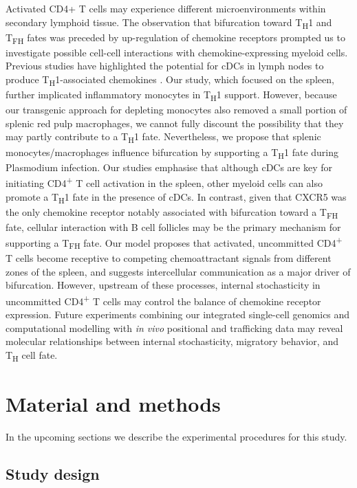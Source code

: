 Activated CD4+ T cells may experience different microenvironments within secondary lymphoid tissue. The observation that bifurcation toward T\textsubscript{H}1 and T\textsubscript{FH} fates was preceded by up-regulation of chemokine receptors prompted us to investigate possible cell-cell interactions with chemokine-expressing myeloid cells. Previous studies have highlighted the potential for cDCs in lymph nodes to produce T\textsubscript{H}1-associated chemokines \cite{Groom2012-az}. Our study, which focused on the spleen, further implicated inflammatory monocytes in T\textsubscript{H}1 support. However, because our transgenic approach for depleting monocytes also removed a small portion of splenic red pulp macrophages, we cannot fully discount the possibility that they may partly contribute to a T\textsubscript{H}1 fate. Nevertheless, we propose that splenic monocytes/macrophages influence bifurcation by supporting a T\textsubscript{H}1 fate during Plasmodium infection. Our studies emphasise that although cDCs are key for initiating CD4\textsuperscript{+} T cell activation in the spleen, other myeloid cells can also promote a T\textsubscript{H}1 fate in the presence of cDCs. In contrast, given that CXCR5 was the only chemokine receptor notably associated with bifurcation toward a T\textsubscript{FH} fate, cellular interaction with B cell follicles may be the primary mechanism for supporting a T\textsubscript{FH} fate. Our model proposes that activated, uncommitted CD4\textsuperscript{+} T cells become receptive to competing chemoattractant signals from different zones of the spleen, and suggests intercellular communication as a major driver of bifurcation. However, upstream of these processes, internal stochasticity in uncommitted CD4\textsuperscript{+} T cells may control the balance of chemokine receptor expression. Future experiments combining our integrated single-cell genomics and computational modelling with \textit{in vivo} positional and trafficking data may reveal molecular relationships between internal stochasticity, migratory behavior, and T\textsubscript{H} cell fate.

\section{Material and methods}

In the upcoming sections we describe the experimental procedures for this study.

\subsection{Study design}

